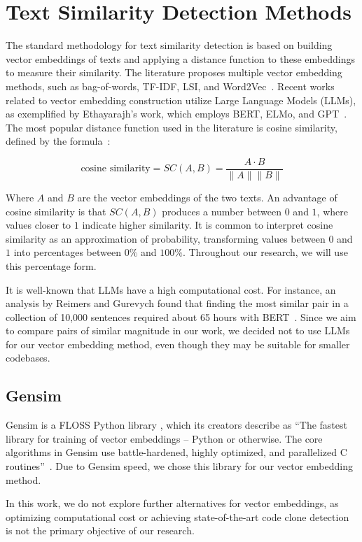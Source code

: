 \en

\section{Text Similarity Detection Methods}
\label{sec:similarity}

The standard methodology for text similarity detection is based on building
vector embeddings of texts and applying a distance function to these embeddings
to measure their similarity. The literature proposes multiple vector
embedding methods, such as bag-of-words, TF-IDF, LSI, and
Word2Vec~\citep{gensimlivro}. Recent works related to vector embedding construction
utilize Large Language Models (LLMs), as exemplified by Ethayarajh's work,
which employs BERT, ELMo, and GPT~\citep{llmsimilar}. The most popular distance
function used in the literature is cosine similarity, defined by the formula~\citep{cosineref}:

$$\text{cosine similarity} = SC(A,B) = \frac{ A \cdot B}{ \lVert A \rVert \lVert B \rVert }$$

Where $A$ and $B$ are the vector embeddings of the two texts. An advantage of
cosine similarity is that $SC(A,B)$ produces a number between $0$ and $1$,
where values closer to $1$ indicate higher similarity. It is common to
interpret cosine similarity as an approximation of probability, transforming
values between $0$ and $1$ into percentages between $0\%$ and $100\%$.
Throughout our research, we will use this percentage form.

It is well-known that LLMs have a high computational cost. For instance, an
analysis by Reimers and Gurevych found that finding the most similar pair in a
collection of 10,000 sentences required about 65 hours with
BERT~\citep{bertsimilar}. Since we aim to compare pairs of similar magnitude in
our work, we decided not to use LLMs for our vector embedding method, even
though they may be suitable for smaller codebases.

\subsection{Gensim}

Gensim is a FLOSS Python library \citep{gensim}, which its creators
describe as ``The fastest library for training of vector embeddings -- Python or
otherwise. The core algorithms in Gensim use battle-hardened, highly optimized,
and parallelized C routines''~\citep{gensimsite}. Due to Gensim speed, we
chose this library for our vector embedding method.

In this work, we do not explore further alternatives for vector embeddings, as
optimizing computational cost or achieving state-of-the-art code clone
detection is not the primary objective of our research.
